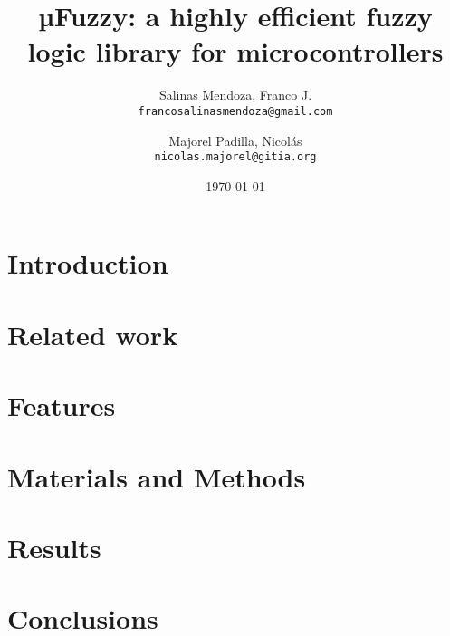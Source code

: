 \documentclass[11pt, a4paper, english]{article}
\author{
	Salinas Mendoza, Franco J. \\
	\texttt{francosalinasmendoza@gmail.com}
	\and
	Majorel Padilla, Nicolás \\
	\texttt{nicolas.majorel@gitia.org}
}
\date{\today}
\title{µFuzzy: a highly efficient fuzzy logic library for microcontrollers}
\begin{document}
\maketitle

\begin{abstract}
\end{abstract}

\section{Introduction}

\section{Related work}
\label{previous work}

\section{Features}
\label{features}

\section{Materials and Methods}
\label{material_and_methods}

\section{Results}
\label{results}

\section{Conclusions}
\label{conclusions}



\end{document}
